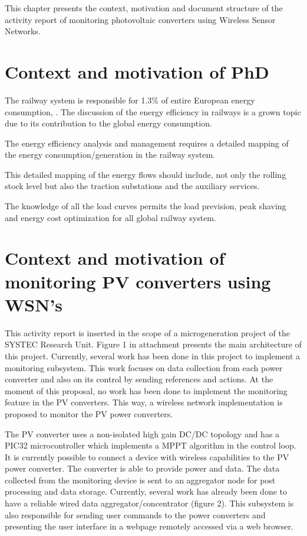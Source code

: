 This chapter presents the context, motivation and document structure of the activity report of monitoring photovoltaic converters using Wireless Sensor Networks. 

\section{Context and motivation of PhD}

The railway system is responsible for 1.3\% of entire European energy consumption, \cite{iea-uic2016}. 
The discussion of the energy efficiency in railways is a grown topic due to its contribution to the global energy consumption.

The energy efficiency analysis and management requires a detailed mapping of the energy consumption/generation in the railway system. 

This detailed mapping of the energy flows should include, not only the rolling stock level but also the traction substations and the auxiliary services.

The knowledge of all the load curves permits the load prevision, peak shaving and energy cost optimization for all global railway system.

\section{Context and motivation of monitoring PV converters using WSN's}


This activity report is inserted in the scope of a microgeneration project of the SYSTEC Research Unit. Figure 1 in attachment presents the main architecture of this project. Currently, several work has been done in this project to implement a monitoring subsystem. This work focuses on data collection from each power converter and also on its control by sending references and actions. At the moment of this proposal, no work has been done to implement the monitoring feature in the PV converters. This way, a wireless network implementation is proposed to monitor the PV power converters.

The PV converter uses a non-isolated high gain DC/DC topology and has a PIC32 microcontroller which implements a MPPT algorithm in the control loop. It is currently possible to connect a device with wireless capabilities to the PV power converter. The converter is able to provide power and data. The data collected from the monitoring device is sent to an aggregator node for post processing and data storage. Currently, several work has already been done to have a reliable wired data aggregator/concentrator (figure 2). This subsystem is also responsible for sending user commands to the power converters and presenting the user interface in a webpage remotely accessed via a web browser. 




